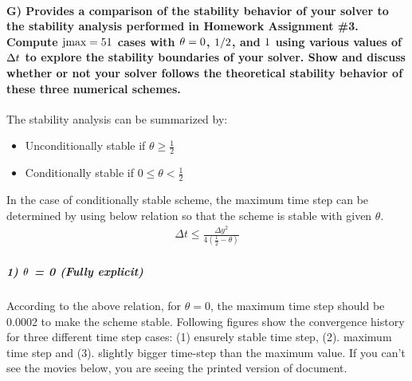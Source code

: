 \documentclass[letterpaper,10pt,english]{sphinxmanual}
\begin{document}
\paragraph{G) Provides a comparison of the stability behavior of your solver to the stability analysis performed in Homework Assignment \#3. Compute \protect\(\text{jmax} = 51\protect\) cases with \protect\(\theta = 0\protect\), \protect\(1/2\protect\), and \protect\(1\protect\) using various values of \protect\(\Delta t\protect\) to explore the stability boundaries of your solver. Show and discuss whether or not your solver follows the theoretical stability behavior of these three numerical schemes.}
\label{\detokenize{cases/results:g-provides-a-comparison-of-the-stability-behavior-of-your-solver-to-the-stability-analysis-performed-in-homework-assignment-3-compute-cases-with-and-using-various-values-of-to-explore-the-stability-boundaries-of-your-solver-show-and-discuss-whether-or-not-your-solver-follows-the-theoretical-stability-behavior-of-these-three-numerical-schemes}}
 The stability analysis can be summarized by:
\begin{itemize}
\item {} 
Unconditionally stable if \(\theta \geqslant \frac{1}{2}\)

\item {} 
Conditionally stable if \(0 \leqslant \theta < \frac{1}{2}\)

\end{itemize}

In the case of conditionally stable scheme, the maximum time step can be determined by using below relation so that the scheme is stable with given \(\theta\).
\begin{equation*}
\begin{split}\Delta t \leqslant \frac{\Delta y^{2}}{4\left ( \frac{1}{2}-\theta \right )}\end{split}
\end{equation*}

\subparagraph{1) \protect\(\theta\protect\) = 0 (Fully explicit)}
\label{\detokenize{cases/results:fully-explicit}}
According to the above relation, for \(\theta = 0\), the maximum time step should be 0.0002 to make the scheme stable. Following figures show the convergence history for three different time step cases: (1) ensurely stable time step, (2). maximum time step and (3). slightly bigger time-step than the maximum value. If you can’t see the movies below, you are seeing the printed version of document.
\end{document}
